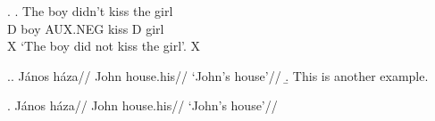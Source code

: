 \documentclass[12pt,letterpaper]{article}
\begin{document}
\ex. \ag. The boy didn't kiss the girl \\
D boy AUX.NEG kiss D girl \\  \hfill {\small\checkmark X}
\trans `The boy did not kiss the girl'. \hfill {\small\checkmark X}

\ex.\a.
	\begingl
    \gla{}J\'anos h\'aza//
    \glb{}John house.his//
    \glft `John's house'//
    \endgl
\b. This is another example.

\ex.\begingl
    \gla{}J\'anos h\'aza//
    \glb{}John house.his//
    \glft `John's house'//
    \endgl
\end{document}
